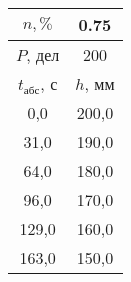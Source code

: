 \begin{tabular}[t]{|c|c|}
\hline
$n, \%$ & 0.75 \\
\hline
$P$, дел & 200 \\
\hline
$t_{абс}$, с & $h$, мм \\ 
\hline
0,0 & 200,0 \\ 
31,0 & 190,0 \\ 
64,0 & 180,0 \\ 
96,0 & 170,0 \\ 
129,0 & 160,0 \\ 
163,0 & 150,0 \\ 
\hline
\end{tabular}